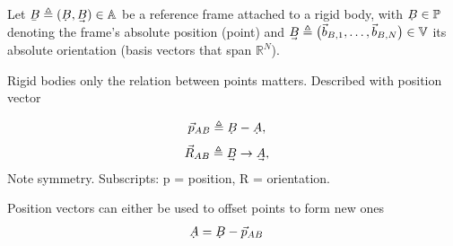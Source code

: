 Let $\ubar{B} \triangleq (\udot{B},\uvec{B}) \in\mathbb{A}$ be a reference frame attached to a rigid body, with  $\udot{B}\in\mathbb{P}$ denoting the frame's absolute position (point) and $\uvec{B}\triangleq\big(\vec{b}_{B,1},\dots,\vec{b}_{B,N}\big)\in\mathbb{V}$ its absolute orientation (basis vectors that span $\mathbb{R}^N$). %
%
%
%

Rigid bodies only the relation between points matters. Described with position vector

%
\begin{align}
\vec{p}_{AB} &\triangleq \udot{B} - \udot{A},\label{eq_position_vector}
\end{align}
\begin{align}
\vec{R}_{AB} &\triangleq \uvec{B} \rightarrow \uvec{A},\label{eq_rotation_dyadic}
\end{align}
%
Note symmetry. Subscripts: p = position, R = orientation.

Position vectors can either be used to offset points to form new ones
%
\begin{align}
\udot{A} &= \udot{B}-\vec{p}_{AB} \label{eq_free_transformation}
\end{align}




